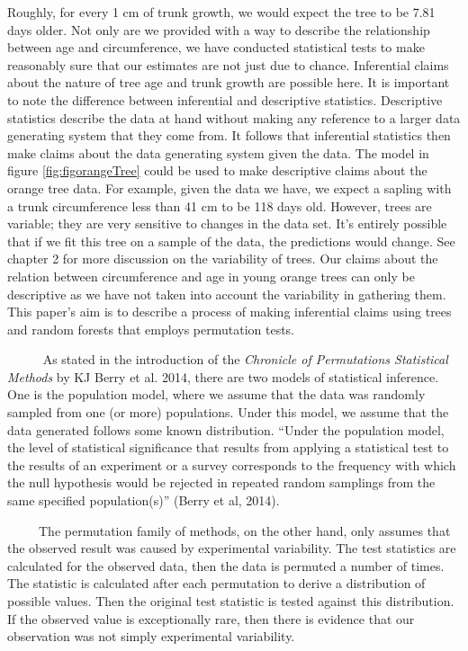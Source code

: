 \documentclass[12pt,twoside]{reedthesis}
\begin{document}
  Roughly, for every 1 cm of trunk growth, we would expect the tree to be
  7.81 days older. Not only are we provided with a way to describe the
  relationship between age and circumference, we have conducted
  statistical tests to make reasonably sure that our estimates are not
  just due to chance. Inferential claims about the nature of tree age and
  trunk growth are possible here. It is important to note the difference
  between inferential and descriptive statistics. Descriptive statistics
  describe the data at hand without making any reference to a larger data
  generating system that they come from. It follows that inferential
  statistics then make claims about the data generating system given the
  data. The model in figure \ref{fig:figorangeTree} could be used to make
  descriptive claims about the orange tree data. For example, given the
  data we have, we expect a sapling with a trunk circumference less than
  41 cm to be 118 days old. However, trees are variable; they are very
  sensitive to changes in the data set. It's entirely possible that if we
  fit this tree on a sample of the data, the predictions would change. See
  chapter 2 for more discussion on the variability of trees. Our claims
  about the relation between circumference and age in young orange trees
  can only be descriptive as we have not taken into account the
  variability in gathering them. This paper's aim is to describe a process
  of making inferential claims using trees and random forests that employs
  permutation tests.
  
  ~~~~~ As stated in the introduction of the \emph{Chronicle of
  Permutations Statistical Methods} by KJ Berry et al. 2014, there are two
  models of statistical inference. One is the population model, where we
  assume that the data was randomly sampled from one (or more)
  populations. Under this model, we assume that the data generated follows
  some known distribution. ``Under the population model, the level of
  statistical significance that results from applying a statistical test
  to the results of an experiment or a survey corresponds to the frequency
  with which the null hypothesis would be rejected in repeated random
  samplings from the same specified population(s)'' (Berry et al, 2014).
  
  ~~~~~The permutation family of methods, on the other hand, only assumes
  that the observed result was caused by experimental variability. The
  test statistics are calculated for the observed data, then the data is
  permuted a number of times. The statistic is calculated after each
  permutation to derive a distribution of possible values. Then the
  original test statistic is tested against this distribution. If the
  observed value is exceptionally rare, then there is evidence that our
  observation was not simply experimental variability.
  
\end{document}
